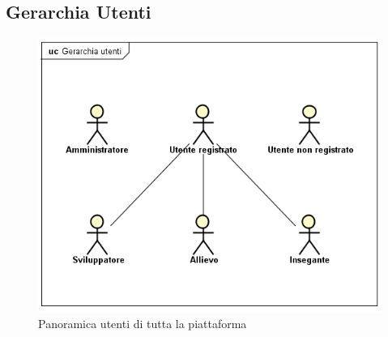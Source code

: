 \subsection{Gerarchia Utenti}
\begin{figure}[H]
\centering
\includegraphics[width=17cm]{img/GerarchiaUtenti.png} 
\caption{Panoramica utenti di tutta la piattaforma}\label{fig:1}
\end{figure}